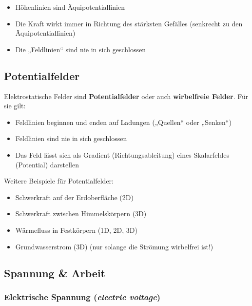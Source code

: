 \documentclass[
  11pt,
]{article}
\providecommand{\tightlist}{%
  \setlength{\itemsep}{0pt}\setlength{\parskip}{0pt}}
\begin{document}
\begin{itemize}
\tightlist
\item
  Höhenlinien sind Äquipotentiallinien
\item
  Die Kraft wirkt immer in Richtung des stärksten Gefälles (senkrecht zu
  den Äquipotentiallinien)
\item
  Die „Feldlinien`` sind nie in sich geschlossen
\end{itemize}

\subsection{Potentialfelder}\label{potentialfelder}

Elektrostatische Felder sind \textbf{Potentialfelder} oder auch
\textbf{wirbelfreie Felder}. Für sie gilt:

\begin{itemize}
\tightlist
\item
  Feldlinien beginnen und enden auf Ladungen („Quellen`` oder „Senken``)
\item
  Feldlinien sind nie in sich geschlossen
\item
  Das Feld lässt sich als Gradient (Richtungsableitung) eines
  Skalarfeldes (Potential) darstellen
\end{itemize}

Weitere Beispiele für Potentialfelder:

\begin{itemize}
\tightlist
\item
  Schwerkraft auf der Erdoberfläche (2D)
\item
  Schwerkraft zwischen Himmelskörpern (3D)
\item
  Wärmefluss in Festkörpern (1D, 2D, 3D)
\item
  Grundwasserstrom (3D) (nur solange die Strömung wirbelfrei ist!)
\end{itemize}

\subsection{Spannung \& Arbeit}\label{spannung-arbeit}

\subsubsection{\texorpdfstring{Elektrische Spannung (\emph{electric
voltage})}{Elektrische Spannung (electric voltage)}}\label{elektrische-spannung-electric-voltage}
\end{document}
